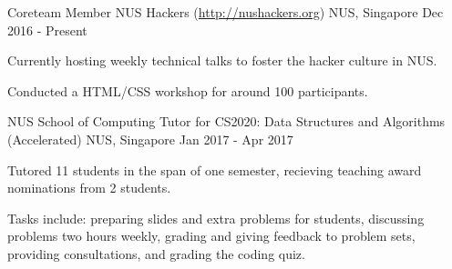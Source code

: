 

\begin{cventries}


  \cventry
  {Coreteam Member} %
  {NUS Hackers (\url{http://nushackers.org})} %
  {NUS, Singapore} %
  {Dec 2016 - Present} %
  { %
    \begin{cvitems}
    \item {Currently hosting weekly technical talks to foster the hacker culture in NUS.}
    \item {Conducted a HTML/CSS workshop for around 100 participants.}
    \end{cvitems}
  }


  \cventry
  {NUS School of Computing} %
  {Tutor for CS2020: Data Structures and Algorithms (Accelerated)} %
  {NUS, Singapore} %
  {Jan 2017 - Apr 2017} %
  { %
    \begin{cvitems}
    \item {Tutored 11 students in the span of one semester, recieving teaching award nominations from 2 students.}
    \item {Tasks include: preparing slides and extra problems for students, discussing problems two hours weekly, grading and giving feedback to problem sets, providing consultations, and grading the coding quiz.}
    \end{cvitems}
  }


\end{cventries}
